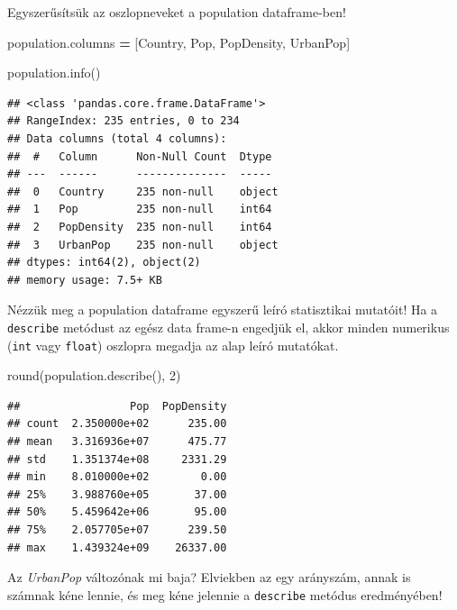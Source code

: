 \documentclass[
]{book}
\newenvironment{Shaded}{\begin{snugshade}}{\end{snugshade}}
\newcommand{\BuiltInTok}[1]{#1}
\newcommand{\DecValTok}[1]{\textcolor[rgb]{0.00,0.00,0.81}{#1}}
\newcommand{\NormalTok}[1]{#1}
\newcommand{\OperatorTok}[1]{\textcolor[rgb]{0.81,0.36,0.00}{\textbf{#1}}}
\newcommand{\StringTok}[1]{\textcolor[rgb]{0.31,0.60,0.02}{#1}}
\begin{document}
Egyszerűsítsük az oszlopneveket a population dataframe-ben!

\begin{Shaded}
\begin{Highlighting}[]
\NormalTok{population.columns }\OperatorTok{=}\NormalTok{ [}\StringTok{\textquotesingle{}Country\textquotesingle{}}\NormalTok{, }\StringTok{\textquotesingle{}Pop\textquotesingle{}}\NormalTok{, }\StringTok{\textquotesingle{}PopDensity\textquotesingle{}}\NormalTok{, }\StringTok{\textquotesingle{}UrbanPop\textquotesingle{}}\NormalTok{]}

\NormalTok{population.info()}
\end{Highlighting}
\end{Shaded}

\begin{verbatim}
## <class 'pandas.core.frame.DataFrame'>
## RangeIndex: 235 entries, 0 to 234
## Data columns (total 4 columns):
##  #   Column      Non-Null Count  Dtype 
## ---  ------      --------------  ----- 
##  0   Country     235 non-null    object
##  1   Pop         235 non-null    int64 
##  2   PopDensity  235 non-null    int64 
##  3   UrbanPop    235 non-null    object
## dtypes: int64(2), object(2)
## memory usage: 7.5+ KB
\end{verbatim}

Nézzük meg a population dataframe egyszerű leíró statisztikai mutatóit! Ha a \texttt{describe} metódust az egész data frame-n engedjük el, akkor minden numerikus (\texttt{int} vagy \texttt{float}) oszlopra megadja az alap leíró mutatókat.

\begin{Shaded}
\begin{Highlighting}[]
\BuiltInTok{round}\NormalTok{(population.describe(), }\DecValTok{2}\NormalTok{)}
\end{Highlighting}
\end{Shaded}

\begin{verbatim}
##                 Pop  PopDensity
## count  2.350000e+02      235.00
## mean   3.316936e+07      475.77
## std    1.351374e+08     2331.29
## min    8.010000e+02        0.00
## 25%    3.988760e+05       37.00
## 50%    5.459642e+06       95.00
## 75%    2.057705e+07      239.50
## max    1.439324e+09    26337.00
\end{verbatim}

Az \emph{UrbanPop} változónak mi baja? Elviekben az egy arányszám, annak is számnak kéne lennie, és meg kéne jelennie a \texttt{describe} metódus eredményében!
\end{document}
